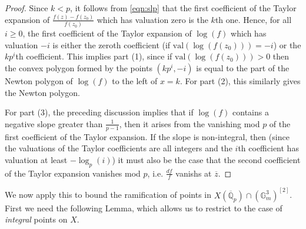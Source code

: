 \documentclass{amsart}
\def\Q{\mathbb Q}
\newcommand{\val}{\mathrm{val}}
\theoremstyle{definition}
\begin{document}
\begin{proof}
Since $k<p$, it follows from \eqref{eqn:slp} that the first coefficient of the Taylor expansion of $\frac{f(z)-f(z_0 )}{f(z_0 )}$ which has valuation zero is the $k $th one. Hence, for all $i\geq 0$, the first coefficient of the Taylor expansion of $\log (f)$ which has valuation $-i$ is either the zeroth coefficient (if $\val (\log (f(z_0 )))=-i$) or the $kp^i$th coefficient. This implies part (1), since if $\val (\log (f(z_0 )))>0$ then the convex polygon formed by the points $(kp^i ,-i)$ is equal to the part of the Newton polygon of $\log (f)$ to the left of $x=k$. For part (2), this similarly gives the Newton polygon. 

For part (3), the preceding discussion implies that if $\log (f)$ contains a negative slope greater than $\frac{1}{p-1}$, then it arises from the vanishing mod $p$ of the first coefficient of the Taylor expansion. If the slope is non-integral, then (since the valuations of the Taylor coefficients are all integers and the $i$th coefficient has valuation at least $-\log _p (i)$) it must also be the case that the second coefficient of the Taylor expansion vanishes mod $p$, i.e. $\frac{df}{f}$ vanishs at $\overline{z}$.
\end{proof}
We now apply this to bound the ramification of points in $X(\overline{\Q }_p )\cap (\mathbb{G}_m ^3 )^{[2]}$. First we need the following Lemma, which allows us to restrict to the case of \textit{integral} points on $X$.
\end{document}
